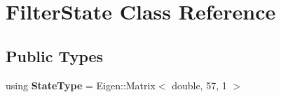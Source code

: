 \hypertarget{class_filter_state}{\section{Filter\-State Class Reference}
\label{class_filter_state}
}
\subsection*{Public Types}
\begin{DoxyCompactItemize}
\item 
\hypertarget{class_filter_state_a26539bef949b11d11deb68ab8fba5598}{using {\bfseries State\-Type} = Eigen\-::\-Matrix$<$ double, 57, 1 $>$}\label{class_filter_state_a26539bef949b11d11deb68ab8fba5598}

\end{DoxyCompactItemize}
